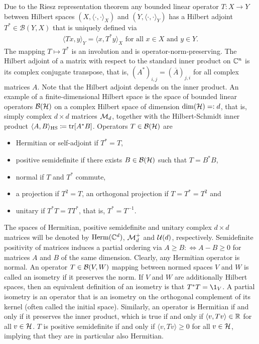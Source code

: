 Due to the Riesz representation theorem any bounded linear operator $T:X\rightarrow Y$ between Hilbert spaces $(X,\langle \cdot, \cdot \rangle_X)$ and $(Y, \langle \cdot , \cdot \rangle_Y)$ has a Hilbert adjoint $T^* \in \mathcal B(Y,X)$ that is uniquely defined via 
\begin{align}
    \langle Tx,y\rangle_Y = \langle x, T^* y \rangle_X \text{ for all } x\in X \text{ and }y\in Y.
\end{align} The mapping $T\mapsto T^*$ is an involution and is operator-norm-preserving. The Hilbert adjoint of a matrix with respect to the standard inner product on $\mathbb{C}^n$ is its complex conjugate transpose, that is, $(A^*)_{i,j} = (\overline A)_{j,i}$ for all complex matrices $A$. Note that the Hilbert adjoint depends on the inner product. An example of a finite-dimensional Hilbert space is the space of bounded linear operators $\mathcal B(\mathcal{H})$ on a complex Hilbert space of dimension $\mathrm{dim}(\mathcal{H})=:d$, that is, simply complex $d\times d$ matrices $\mathcal M_d$, together with the Hilbert-Schmidt inner product $\langle A, B \rangle _\text{HS}\coloneqq \mathrm{tr}[A^*B]$. Operators $T \in \mathcal B(\mathcal{H})$ are
\begin{itemize}
    \item Hermitian or self-adjoint if $T^* = T$,
    \item positive semidefinite if there exists $B \in \mathcal B(\mathcal{H})$ such that $T = B^*B$,
    \item normal if $T$ and $T^*$ commute,
    \item a projection if $T^2 = T$, an orthogonal projection if $T=T^*=T^2$ and
    \item unitary if $T^*T = TT^*$, that is, $T^* = T^{-1}$.
\end{itemize}
The spaces of Hermitian, positive semidefinite and unitary complex $d\times d$ matrices will be denoted by $\text{Herm}(\mathbb{C}^d)$, $\mathcal M_d^+$ and $\mathcal U(d)$, respectively. Semidefinite positivity of matrices induces a partial ordering via $A\geq B:\Leftrightarrow A-B\geq  0 $ for matrices $A$ and $B$ of the same dimension. Clearly, any Hermitian operator is normal.  An operator $T\in \mathcal B(V,W)$ mapping between normed spaces $V$ and $W$ is called an isometry if it preserves the norm. If $V$ and $W$ are additionally Hilbert spaces, then an equivalent definition of an isometry is that $T^*T = \1_{V}$. A partial isometry is an operator that is an isometry on the orthogonal complement of its kernel (often called the initial space). Similarly, an operator is Hermitian if and only if it preserves the inner product, which is true if and only if $\langle v, T v\rangle \in \mathbb{R}$ for all $v\in \mathcal{H}$. $T$ is positive semidefinite if and only if $\langle v, T v\rangle \geq 0$ for all $v\in \mathcal{H}$, implying that they are in particular also Hermitian.

